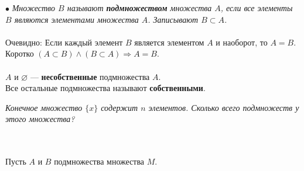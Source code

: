 $\bullet$ \textit{Множество $B$ называют \textbf{подмножеством} множества $A$, если все элементы $B$ являются элементами множества $A$. Записывают $B \subset A$.} \\\\
Очевидно: Если каждый элемент $B$ является элементом $A$ и наоборот, то $A=B$.\\
Коротко $(A \subset B) \wedge (B \subset A) \Rightarrow A=B$.\\\\
$A$ и $\varnothing$ --- \textbf{несобственные} подмножества $A$.\\
Все остальные подмножества называют \textbf{собственными}.\\
\begin{exercise}
	\textit{Конечное множество $\{x\}$ содержит $n$ элементов. Сколько всего подмножеств у этого множества?}
\end{exercise}\\\\
Пусть $A$ и $B$ подмножества множества $M$.
